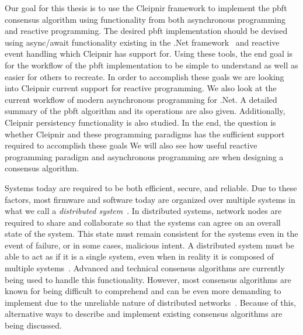 Our goal for this thesis is to use the Cleipnir framework to implement the \acl{pbft} consensus algorithm using functionality from both asynchronous programming and reactive programming. The desired \ac{pbft} implementation should be devised using async/await functionality existing in the .Net framework~\cite{DOC:AsyncAwait} and reactive event handling which Cleipnir has support for. Using these tools, the end goal is for the workflow of the \ac{pbft} implementation to be simple to understand as well as easier for others to recreate. In order to accomplish these goals we are looking into Cleipnir current support for reactive programming. We also look at the current workflow of modern asynchronous programming for .Net. A detailed summary of the \ac{pbft} algorithm and its operations are also given. Additionally, Cleipnir persistency functionality is also studied.
In the end, the question is whether Cleipnir and these programming paradigms has the sufficient support required to accomplish these goals We will also see how useful reactive programming paradigm and asynchronous programming are when designing a consensus algorithm.
\fi

Systems today are required to be both efficient, secure, and reliable. Due to these factors, most firmware and software today are organized over multiple systems in what we call a \textit{distributed system}~\cites{WEB:DistSys}[p.~16]{BOOK:MVstandver3}. In distributed systems, network nodes are required to share and collaborate so that the systems can agree on an overall state of the system. This state must remain consistent for the systems even in the event of failure, or in some cases, malicious intent. A distributed system must be able to act as if it is a single system, even when in reality it is composed of multiple systems~\cite[p.~18]{BOOK:MVstandver3}. Advanced and technical consensus algorithms are currently being used to handle this functionality.
However, most consensus algorithms are known for being difficult to comprehend and can be even more demanding to implement due to the unreliable nature of distributed networks~\cites[p.~459]{BOOK:MVstandver3}[p.~13]{PAPER:EivindPaper}. Because of this, alternative ways to describe and implement existing consensus algorithms are being discussed.

